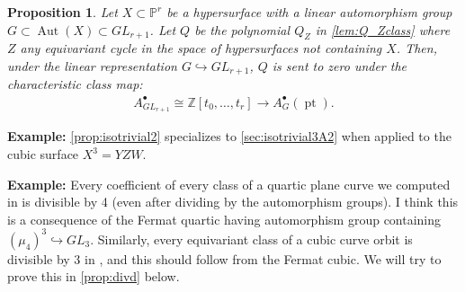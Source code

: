 \documentclass[12 pt]{amsart}
\newtheorem{proposition}{Proposition}[section]
\newenvironment{example}{\textbf{Example:}}{}
\newcommand{\<}{\left\langle}
\renewcommand{\>}{\right\rangle}
\begin{document}
\begin{proposition}
\label{prop:isotrivial2}
Let $X\subset \mathbb{P}^r$ be a hypersurface with a linear automorphism group $G\subset \operatorname{Aut}(X)\subset GL_{r+1}$. Let $Q$ be the polynomial $Q_Z$ in \autoref{lem:Q_Zclass} where $Z$ \emph{any} equivariant cycle in the space of hypersurfaces not containing $X$. Then, under the linear representation $G\hookrightarrow GL_{r+1}$, $Q$ is sent to zero under the characteristic class map:
\begin{align*}
    A^{\bullet}_{GL_{r+1}}\cong \mathbb{Z}[t_0,\ldots,t_{r}]\to A^{\bullet}_{G}(\operatorname{pt}). 
\end{align*}
\end{proposition}



\begin{example}
\autoref{prop:isotrivial2} specializes to \autoref{sec:isotrivial3A2} when applied to the cubic surface $X^3=YZW$.
\end{example}

\begin{example}
Every coefficient of every class of a quartic plane curve we computed in \cite{LPT19} is divisible by 4 (even after dividing by the automorphism groups). I think this is a consequence of the Fermat quartic having automorphism group containing $(\mu_4)^3\hookrightarrow GL_3$. Similarly, every equivariant class of a cubic curve orbit is divisible by 3 in \cite[Appendix C]{LPT19}, and this should follow from the Fermat cubic. We will try to prove this in \autoref{prop:divd} below.
\end{example}
\end{document}
